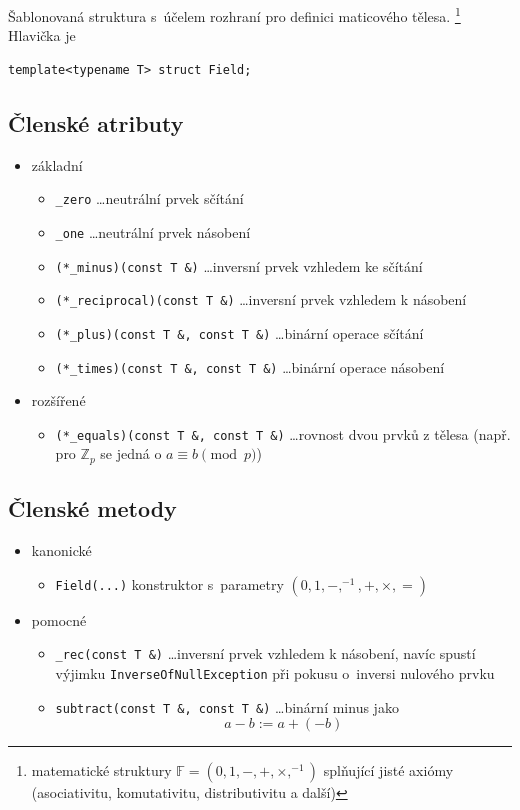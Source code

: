 \documentclass[11pt,a4paper]{article}
\theoremstyle{remark}
\begin{document}
Šablonovaná struktura s~účelem rozhraní pro definici maticového
tělesa.\thinspace%
\footnote{matematické struktury $\mathbb{F} = (0, 1, -, +, \times, ^{-1})$
splňující jisté axiómy (asociativitu, komutativitu, distributivitu a další)}
Hlavička je
\begin{verbatim}
template<typename T> struct Field;
\end{verbatim}

\subsection{Členské atributy}

\begin{itemize}
  \item základní
  \begin{itemize}
    \item \verb=_zero= \ldots neutrální prvek sčítání
    \item \verb=_one= \ldots neutrální prvek násobení
    \item \verb=(*_minus)(const T &)= \ldots inversní prvek vzhledem ke sčítání
    \item \verb=(*_reciprocal)(const T &)= \ldots inversní prvek vzhledem k
      násobení
    \item \verb=(*_plus)(const T &, const T &)= \ldots binární operace sčítání
    \item \verb=(*_times)(const T &, const T &)= \ldots binární operace
      násobení
  \end{itemize}
  \item rozšířené
  \begin{itemize}
    \item \verb=(*_equals)(const T &, const T &)= \ldots rovnost dvou prvků z
      tělesa (např. pro $\mathbb{Z}_p$ se jedná o $a \equiv b \pmod p$)
  \end{itemize}
\end{itemize}

\subsection{Členské metody}

\begin{itemize}
  \item kanonické
  \begin{itemize}
    \item \verb=Field(...)= konstruktor s~parametry $(0, 1, -, ^{-1}, +,
      \times, =)$
  \end{itemize}
  \item pomocné
  \begin{itemize}
    \item \verb=_rec(const T &)= \ldots inversní prvek vzhledem k násobení,
      navíc spustí výjimku \verb=InverseOfNullException= při pokusu o~inversi
      nulového prvku
    \item \verb=subtract(const T &, const T &)= \ldots binární minus jako
      \[
        a - b := a + (-b)
      \]
  \end{itemize}
\end{itemize}
\end{document}
